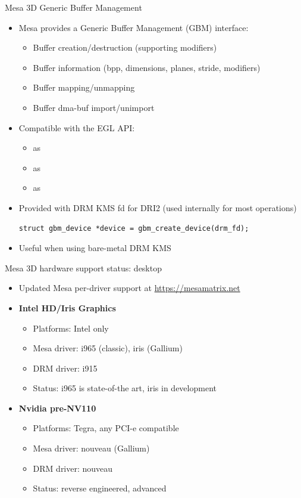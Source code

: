 \begin{frame}[fragile]{Mesa 3D Generic Buffer Management}
  \begin{itemize}
  \item Mesa provides a Generic Buffer Management (GBM) interface:
    \begin{itemize}
    \item Buffer creation/destruction (supporting modifiers)
    \item Buffer information (bpp, dimensions, planes, stride, modifiers)
    \item Buffer mapping/unmapping
    \item Buffer dma-buf import/unimport
    \end{itemize}
  \item Compatible with the EGL API:
    \begin{itemize}
    \item {} as 
    \item {} as 
    \item {} as 
    \end{itemize}
  \item Provided with DRM KMS fd for DRI2 (used internally for most operations)\\
  \begin{verbatim}
struct gbm_device *device = gbm_create_device(drm_fd);
  \end{verbatim}
  \item Useful when using bare-metal DRM KMS
  \end{itemize}
\end{frame}

\begin{frame}{Mesa 3D hardware support status: desktop}
  \begin{itemize}
  \item Updated Mesa per-driver support at \url{https://mesamatrix.net}
  \item \textbf{Intel HD/Iris Graphics}
    \begin{itemize}
    \item Platforms: Intel only
    \item Mesa driver: i965 (classic), iris (Gallium)
    \item DRM driver: i915
    \item Status: i965 is state-of-the art, iris in development
    \end{itemize}
  \item \textbf{Nvidia pre-NV110}
    \begin{itemize}
    \item Platforms: Tegra, any PCI-e compatible
    \item Mesa driver: nouveau (Gallium)
    \item DRM driver: nouveau
    \item Status: reverse engineered, advanced
    \end{itemize}
  \end{itemize}
\end{frame}

